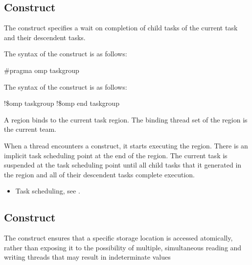 \subsection{ Construct}
\label{subsec:taskgroup Construct}
\summary
The  construct specifies a wait on completion of child tasks of the current 
task and their descendent tasks.

\syntax
\ccppspecificstart
The syntax of the  construct is as follows:

\begin{boxedcode}
\#pragma omp taskgroup 
\end{boxedcode}
\ccppspecificend

\fortranspecificstart
The syntax of the  construct is as follows:

\begin{boxedcode}
!\$omp taskgroup
!\$omp end taskgroup
\end{boxedcode}
\fortranspecificend

\binding
A  region binds to the current task region. The binding thread set of the 
 region is the current team.

\descr
When a thread encounters a  construct, it starts executing the region. There 
is an implicit task scheduling point at the end of the  region. The current 
task is suspended at the task scheduling point until all child tasks that it generated in the 
 region and all of their descendent tasks complete execution.

\crossreferences
\begin{itemize}
\item Task scheduling, see 
.
\end{itemize}










\subsection{ Construct}
\label{subsec:atomic Construct}
\summary
The  construct ensures that a specific storage location is accessed atomically, 
rather than exposing it to the possibility of multiple, simultaneous reading and writing 
threads that may result in indeterminate values

